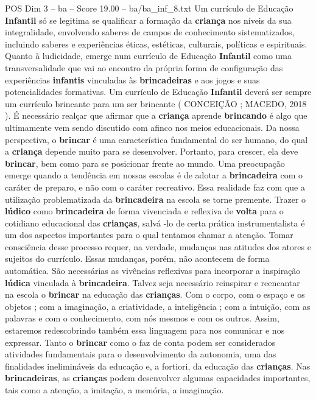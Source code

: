 \begin{textsample}{POS Dim 3 – ba – Score 19.00 – ba/ba\_inf\_8.txt}
Um currículo de Educação \textbf{Infantil} só se legitima se qualificar a formação da \textbf{criança} nos níveis da sua integralidade, envolvendo saberes de campos de conhecimento sistematizados, incluindo saberes e experiências éticas, estéticas, culturais, políticas e espirituais.
Quanto à ludicidade, emerge num currículo de Educação \textbf{Infantil} como uma transversalidade que vai ao encontro da própria forma de configuração das experiências \textbf{infantis} vinculadas às \textbf{brincadeiras} e aos jogos e suas potencialidades formativas.
Um currículo de Educação \textbf{Infantil} deverá ser sempre um currículo brincante para um ser brincante ( CONCEIÇÃO ; MACEDO, 2018 ).
É necessário realçar que afirmar que a \textbf{criança} aprende \textbf{brincando} é algo que ultimamente vem sendo discutido com afinco nos meios educacionais.
Da nossa perspectiva, o \textbf{brincar} é uma característica fundamental do ser humano, do qual a \textbf{criança} depende muito para se desenvolver.
Portanto, para crescer, ela deve \textbf{brincar}, bem como para se posicionar frente ao mundo.
Uma preocupação emerge quando a tendência em nossas escolas é de adotar a \textbf{brincadeira} com o caráter de preparo, e não com o caráter recreativo.
Essa realidade faz com que a utilização problematizada da \textbf{brincadeira} na escola se torne premente.
Trazer o \textbf{lúdico} como \textbf{brincadeira} de forma vivenciada e reflexiva de \textbf{volta} para o cotidiano educacional das \textbf{crianças}, salvá -lo de certa prática instrumentalista é um dos aspectos importantes para o qual tentamos chamar a atenção.
Tomar consciência desse processo requer, na verdade, mudanças nas atitudes dos atores e sujeitos do currículo.
Essas mudanças, porém, não acontecem de forma automática.
São necessárias as vivências reflexivas para incorporar a inspiração \textbf{lúdica} vinculada à \textbf{brincadeira}.
Talvez seja necessário reinspirar e reencantar na escola o \textbf{brincar} na educação das \textbf{crianças}.
Com o corpo, com o espaço e os objetos ; com a imaginação, a criatividade, a inteligência ; com a intuição, com as palavras e com o conhecimento, com nós mesmos e com os outros.
Assim, estaremos redescobrindo também essa linguagem para nos comunicar e nos expressar.
Tanto o \textbf{brincar} como o faz de conta podem ser considerados atividades fundamentais para o desenvolvimento da autonomia, uma das finalidades inelimináveis da educação e, a fortiori, da educação das \textbf{crianças}.
Nas \textbf{brincadeiras}, as \textbf{crianças} podem desenvolver algumas capacidades importantes, tais como a atenção, a imitação, a memória, a imaginação.

\end{textsample}
